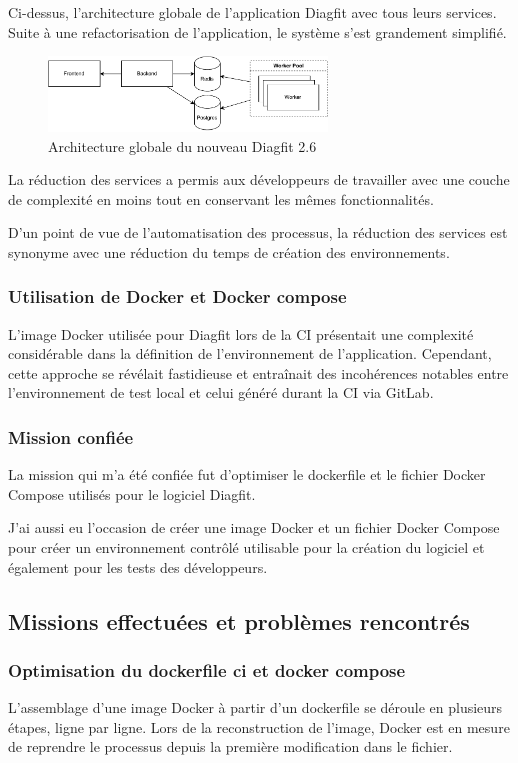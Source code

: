 Ci-dessus, l'architecture globale de l'application Diagfit avec tous leurs services.
Suite à une refactorisation de l'application, le système s'est grandement simplifié.

\begin{figure}[ht!]
    \centering
    \includegraphics[width=0.66\textwidth]{paper/figures/archi2-6.pdf}
    \caption{Architecture globale du nouveau Diagfit 2.6}
    \label{fig:archi2-6}
\end{figure}

La réduction des services a permis aux développeurs de travailler avec une couche de complexité en moins tout en conservant les mêmes fonctionnalités.

D'un point de vue de l'automatisation des processus, la réduction des services est synonyme avec une réduction du temps de création des environnements.

\subsubsection{Utilisation de Docker et Docker compose}
L'image Docker utilisée pour Diagfit lors de la CI présentait une complexité considérable dans la définition de l'environnement de l'application.
Cependant, cette approche se révélait fastidieuse et entraînait des incohérences notables entre l'environnement de test local et celui généré durant la CI via GitLab.

\subsubsection{Mission confiée}
La mission qui m'a été confiée fut d'optimiser le dockerfile et le fichier Docker Compose utilisés pour le logiciel Diagfit.

J'ai aussi eu l'occasion de créer une image Docker et un fichier Docker Compose pour créer un environnement contrôlé utilisable pour la création du logiciel et également pour les tests des développeurs.

\subsection{Missions effectuées et problèmes rencontrés}
\subsubsection{Optimisation du dockerfile ci et docker compose}
L'assemblage d'une image Docker à partir d'un dockerfile se déroule en plusieurs étapes, ligne par ligne.
Lors de la reconstruction de l'image, Docker est en mesure de reprendre le processus depuis la première modification dans le fichier.

